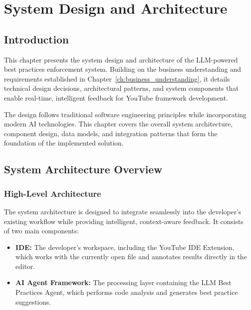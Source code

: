 
\setcounter{chapter}{2}
\chapter{System Design and Architecture}
\minitoc %
\graphicspath{{Chapitre3/figures/}}

\pagestyle{fancy}
\fancyhf{}
\fancyhead[R]{\bfseries\rightmark}
\fancyfoot[R]{\thepage}
\renewcommand{\headrulewidth}{0.5pt}
\renewcommand{\footrulewidth}{0pt}
\renewcommand{\chaptermark}[1]{\markboth{{\chaptername~\thechapter. #1 }}{}}
\renewcommand{\sectionmark}[1]{\markright{\thechapter.\thesection~ #1}}

\begin{spacing}{1.2}

\section*{Introduction}
This chapter presents the system design and architecture of the LLM-powered best practices enforcement system. Building on the business understanding and requirements established in Chapter~\ref{ch:business_understanding}, it details technical design decisions, architectural patterns, and system components that enable real-time, intelligent feedback for YouTube framework development.

The design follows traditional software engineering principles while incorporating modern AI technologies. This chapter covers the overall system architecture, component design, data models, and integration patterns that form the foundation of the implemented solution.

\section{System Architecture Overview}

\subsection{High-Level Architecture}
The system architecture is designed to integrate seamlessly into the developer's existing workflow while providing intelligent, context-aware feedback. It consists of two main components:

\begin{itemize}
    \item \textbf{IDE:} The developer's workspace, including the YouTube IDE Extension, which works with the currently open file and annotates results directly in the editor.
    \item \textbf{AI Agent Framework:} The processing layer containing the LLM Best Practices Agent, which performs code analysis and generates best practice suggestions.
\end{itemize}


\end{spacing}

